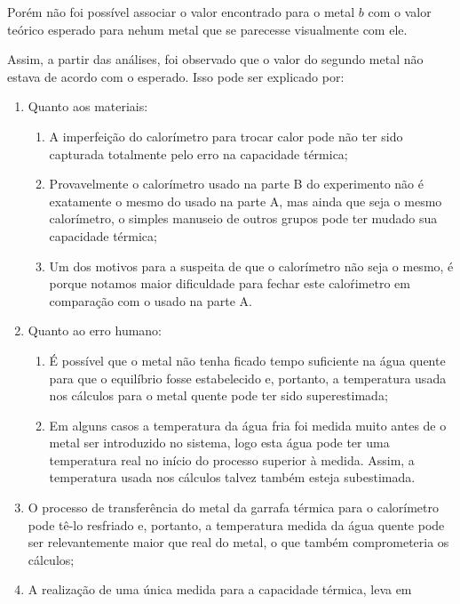 \documentclass[a4paper]{article}
\begin{document}
				Porém não foi possível associar o valor encontrado para o metal $b$
				com o valor teórico esperado para nehum metal que se parecesse visualmente
				com ele.

				Assim, a partir das análises, foi observado que o valor do segundo metal
				não estava de acordo com o esperado. Isso pode ser explicado por: 

				\begin{enumerate}
					\item Quanto aos materiais: 
						\begin{enumerate}
							\item A imperfeição do calorímetro para trocar calor pode não ter sido capturada
							totalmente pelo erro na capacidade térmica; 
							\item Provavelmente o calorímetro usado na parte B do experimento não é
							exatamente o mesmo do usado na parte A, mas ainda que seja o mesmo
							calorímetro, o simples manuseio de outros grupos pode ter mudado sua
							capacidade térmica; 
							\item Um dos motivos para a suspeita de que o calorímetro não seja o mesmo,
							é porque notamos maior dificuldade para fechar este calo\'{r}imetro
							em comparação com o usado na parte A. 
						\end{enumerate}
					\item Quanto ao erro humano: 
						\begin{enumerate}
							\item É possível que o metal não tenha ficado tempo suficiente na água quente
							para que o equilíbrio fosse estabelecido e, portanto, a temperatura
							usada nos cálculos para o metal quente pode ter sido superestimada; 
							\item Em alguns casos a temperatura da água fria foi medida muito antes
							de o metal ser introduzido no sistema, logo esta água pode ter uma
							temperatura real no início do processo superior à medida. Assim, a
							temperatura usada nos cálculos talvez também esteja subestimada. 
						\end{enumerate}
					\item O processo de transferência do metal da garrafa térmica para o calorímetro
					pode tê-lo resfriado e, portanto, a temperatura medida da água quente
					pode ser relevantemente maior que real do metal, o que também comprometeria
					os cálculos; 
					\item A realização de uma única medida para a capacidade térmica, leva em

\end{enumerate}
\end{document}
